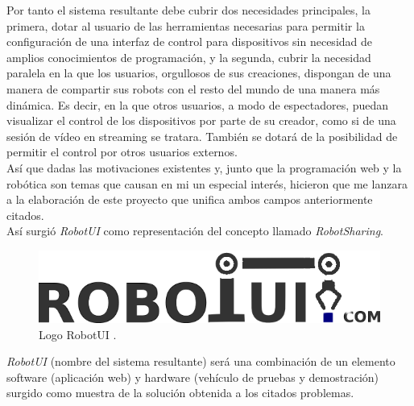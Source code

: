 \documentclass[a4paper,12pt]{article}
\begin{document}
Por tanto el sistema resultante debe cubrir dos necesidades principales, la primera, dotar al usuario de las herramientas necesarias para permitir la configuración de una interfaz de control para 
dispositivos sin necesidad de amplios conocimientos de programación, y la segunda, cubrir la necesidad paralela en la que los usuarios, orgullosos de sus creaciones, dispongan de una manera de 
compartir sus robots con el resto del mundo de una manera más dinámica. Es decir, en la que otros usuarios, a modo de espectadores, puedan visualizar el control de los dispositivos por parte de 
su creador, como si de una sesión de vídeo en streaming se tratara. También se dotará de la posibilidad de permitir el control por otros usuarios externos.\\

Así que dadas las motivaciones existentes y, junto que la programación web y la robótica son temas que causan en mi un especial interés, hicieron que me lanzara a la elaboración de este
proyecto que unifica ambos campos anteriormente citados.\\

Así surgió \emph{RobotUI} como representación del concepto llamado \textit{RobotSharing}.\\

\begin{figure}[H]
  \begin{center}
    \includegraphics[scale=0.5]{imagenes/logotipo.png}
  \end{center}
 \caption{Logo RobotUI \protect\footnotemark.}
\end{figure}


\emph{RobotUI} (nombre del sistema resultante) será una combinación de un elemento software (aplicación web) y hardware (vehículo de pruebas y demostración) surgido como muestra de la solución obtenida a los citados problemas.\\
\end{document}

